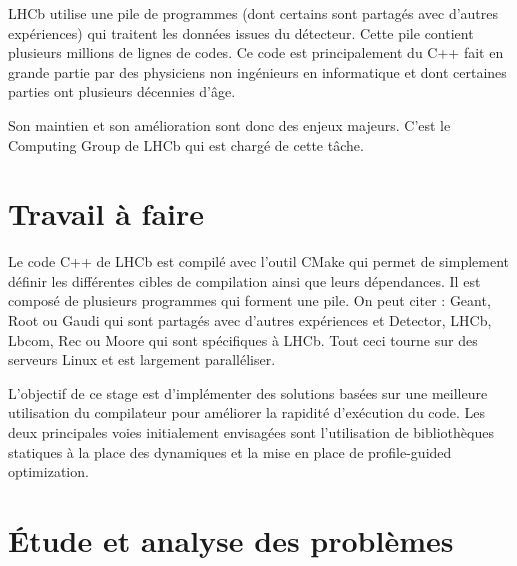 \documentclass[a4paper,11pt]{report}
\begin{document}
LHCb utilise une pile de programmes (dont certains sont partagés avec d'autres expériences) qui traitent les données issues du détecteur.
Cette pile contient plusieurs millions de lignes de codes.
Ce code est principalement du C++ fait en grande partie par des physiciens non ingénieurs en informatique et dont certaines parties ont plusieurs décennies d'âge.

Son maintien et son amélioration sont donc des enjeux majeurs.
C'est le Computing Group de LHCb qui est chargé de cette tâche.

\section{Travail à faire}
Le code C++ de LHCb est compilé avec l'outil CMake \cite{cmake} qui permet de simplement définir les différentes cibles de compilation ainsi que leurs dépendances.
Il est composé de plusieurs programmes qui forment une pile.
On peut citer : Geant, Root ou Gaudi qui sont partagés avec d'autres expériences et Detector, LHCb, Lbcom, Rec ou Moore qui sont spécifiques à LHCb.
Tout ceci tourne sur des serveurs Linux et est largement paralléliser.

L'objectif de ce stage est d'implémenter des solutions basées sur une meilleure utilisation du compilateur pour améliorer la rapidité d'exécution du code.
Les deux principales voies initialement envisagées sont l'utilisation de bibliothèques statiques à la place des dynamiques et la mise en place de profile-guided optimization.

\section{Étude et analyse des problèmes}
\end{document}
